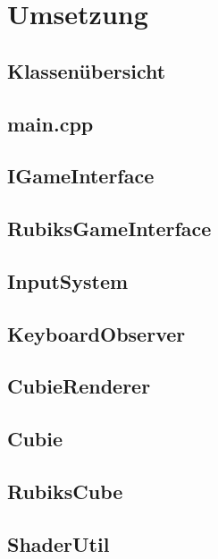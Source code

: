 \chapter{Umsetzung}

\section{Klassenübersicht}

\section{main.cpp}

\section{IGameInterface}

\section{RubiksGameInterface}

\section{InputSystem}

\section{KeyboardObserver}

\section{CubieRenderer}

\section{Cubie}

\section{RubiksCube}

\section{ShaderUtil}